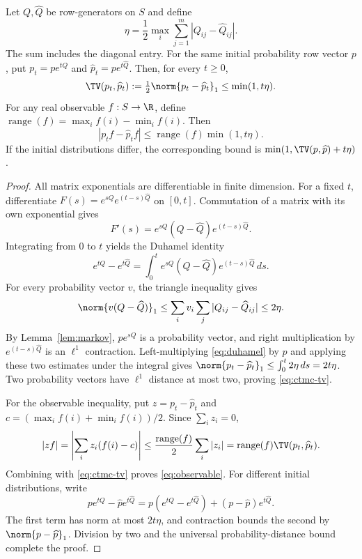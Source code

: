 \begin{theorem}
\label{thm:ctmc}
Let $Q,\widehat Q$ be row-generators on $S$ and define
\begin{equation}
 \eta=\frac12\max_i\sum_{j=1}^m|Q_{ij}-\widehat Q_{ij}|.
 \label{eq:eta}
\end{equation}
The sum includes the diagonal entry. For the same initial probability
row vector $p$, put $p_t=pe^{tQ}$ and
$\widehat p_t=pe^{t\widehat Q}$. Then, for every $t\ge0$,
\begin{equation}
 \TV(p_t,\widehat p_t):=\tfrac12\norm{p_t-\widehat p_t}_1
 \le\min(1,t\eta).
 \label{eq:ctmc-tv}
\end{equation}
For any real observable $f:S\to\R$, define
$\operatorname{range}(f)=\max_i f(i)-\min_i f(i)$. Then
\begin{equation}
 |p_t f-\widehat p_t f|
 \le\operatorname{range}(f)\min(1,t\eta).
 \label{eq:observable}
\end{equation}
If the initial distributions differ, the corresponding bound is
$\min(1,\TV(p,\widehat p)+t\eta)$.
\end{theorem}
\begin{proof}
All matrix exponentials are differentiable in finite dimension. For a fixed
$t$, differentiate $F(s)=e^{sQ}e^{(t-s)\widehat Q}$ on $[0,t]$.
Commutation of a matrix with its own exponential gives
\[
 F'(s)=e^{sQ}(Q-\widehat Q)e^{(t-s)\widehat Q}.
\]
Integrating from $0$ to $t$ yields the Duhamel identity
\begin{equation}
 e^{tQ}-e^{t\widehat Q}
 =\int_0^t e^{sQ}(Q-\widehat Q)e^{(t-s)\widehat Q}\,ds.
 \label{eq:duhamel}
\end{equation}
For every probability vector $v$, the triangle inequality gives
\[
 \norm{v(Q-\widehat Q)}_1
 \le\sum_i v_i\sum_j|Q_{ij}-\widehat Q_{ij}|\le2\eta.
\]
By Lemma~\ref{lem:markov}, $pe^{sQ}$ is a probability vector, and
right multiplication by $e^{(t-s)\widehat Q}$ is an $\ell^1$
contraction. Left-multiplying \eqref{eq:duhamel} by $p$ and applying
these two estimates under the integral gives
$\norm{p_t-\widehat p_t}_1\le\int_0^t2\eta\,ds=2t\eta$.
Two probability vectors have $\ell^1$ distance at most two, proving
\eqref{eq:ctmc-tv}.

For the observable inequality, put $z=p_t-\widehat p_t$ and
$c=(\max_i f(i)+\min_i f(i))/2$. Since $\sum_i z_i=0$,
\[
 |zf|=\left|\sum_i z_i(f(i)-c)\right|
 \le\frac{\operatorname{range}(f)}2\sum_i|z_i|
 =\operatorname{range}(f)\TV(p_t,\widehat p_t).
\]
Combining with \eqref{eq:ctmc-tv} proves \eqref{eq:observable}.
For different initial distributions, write
\[
 pe^{tQ}-\widehat p e^{t\widehat Q}
 =p(e^{tQ}-e^{t\widehat Q})
   +(p-\widehat p)e^{t\widehat Q}.
\]
The first term has norm at most $2t\eta$, and contraction bounds the
second by $\norm{p-\widehat p}_1$. Division by two and the universal
probability-distance bound complete the proof.
\end{proof}

